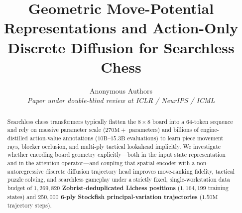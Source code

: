 \documentclass[10pt]{article}
\title{\textbf{Geometric Move-Potential Representations and Action-Only Discrete Diffusion for Searchless Chess}}
\author{Anonymous Authors \\ \textit{Paper under double-blind review at ICLR / NeurIPS / ICML}}
\date{}
\begin{document}
\maketitle

\begin{abstract}
Searchless chess transformers typically flatten the $8 \times 8$ board into a 64-token sequence and rely on massive parameter scale ($270\text{M}+$ parameters) and billions of engine-distilled action-value annotations ($10\text{B}\text{--}15.3\text{B}$ evaluations) to learn piece movement rays, blocker occlusion, and multi-ply tactical lookahead implicitly. We investigate whether encoding board geometry explicitly---both in the input state representation and in the attention operator---and coupling that spatial encoder with a non-autoregressive discrete diffusion trajectory head improves move-ranking fidelity, tactical puzzle solving, and searchless gameplay under a strictly fixed, single-workstation data budget of \textbf{$1{,}269{,}820$ Zobrist-deduplicated Lichess positions} ($1{,}164{,}199$ training states) and \textbf{$250{,}000$ 6-ply Stockfish principal-variation trajectories} ($1.50\text{M}$ trajectory steps).


\end{abstract}
\end{document}
